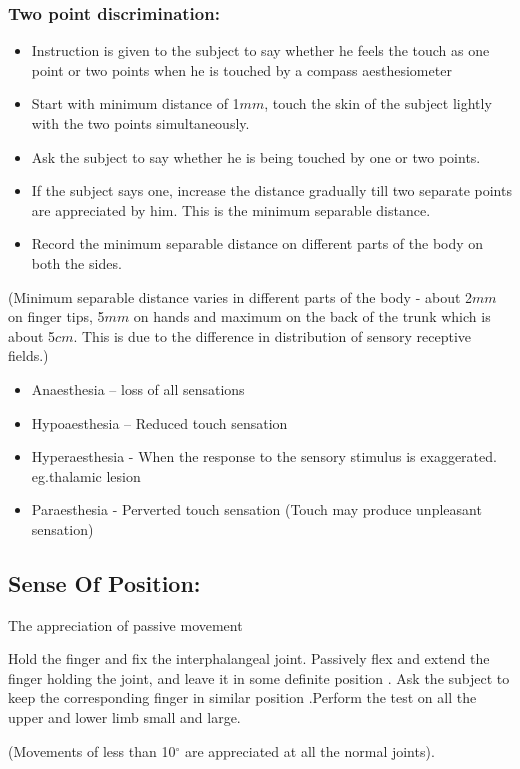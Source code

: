 \documentclass[a4paper,12pt,openany,oneside]{book}
\begin{document}
\subsubsection*{Two point discrimination:}
\begin{itemize}
\item{Instruction is given to the subject to say whether he feels the touch as one point or two points when he is touched by a compass aesthesiometer}
\item{Start with minimum distance of 1$mm$, touch the skin of the subject lightly with the two points simultaneously.}
\item{Ask the subject to say whether he is being touched by one or two points.}
\item{If the subject says one, increase the distance gradually till two separate points are appreciated by him. This is the minimum separable distance.}
\item{Record the minimum separable distance on different parts of the body on both the sides.}
\end{itemize}
\par
(Minimum separable distance varies in different parts of the body - about 2$mm$ on finger tips, 5$mm$ on hands and maximum on the back of the trunk which is about 5$cm$. This is due to the difference in distribution of sensory receptive fields.)
\begin{itemize}
\item[]Anaesthesia 	– loss of all sensations
\item[]Hypoaesthesia 	– Reduced touch sensation
\item[]Hyperaesthesia 	- When the response to the sensory stimulus is exaggerated.  eg.thalamic lesion
\item[]Paraesthesia 	- Perverted touch sensation (Touch may produce unpleasant 				sensation)
\end{itemize}

\subsection*{Sense Of Position:}
\par
The appreciation of passive movement
\par
	Hold the finger and fix the interphalangeal joint. Passively flex and extend the finger holding the joint, and leave it in some definite position . Ask the subject to keep the corresponding finger in similar position .Perform the test on all the upper and lower limb small and large.
	\par
(Movements of less than 10${^\circ}$ are appreciated at all the normal joints).
\end{document}
